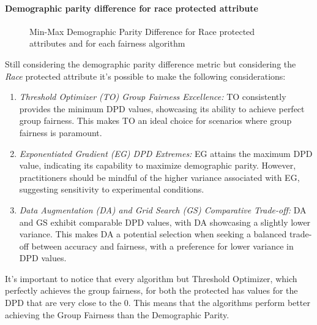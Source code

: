 \paragraph{Demographic parity difference for race protected attribute}

\begin{figure}[H]
    \centering
    \caption{Min-Max Demographic Parity Difference for Race protected attributes and for each fairness algorithm}
\end{figure}

Still considering the demographic parity difference metric but considering the \emph{Race} protected attribute it's possible to make the following considerations:

\begin{enumerate}
    \item \emph{Threshold Optimizer (TO) Group Fairness Excellence:} TO consistently provides the minimum DPD values, showcasing its ability to achieve perfect group fairness. This makes TO an ideal choice for scenarios where group fairness is paramount.

    \item \emph{Exponentiated Gradient (EG) DPD Extremes:} EG attains the maximum DPD value, indicating its capability to maximize demographic parity. However, practitioners should be mindful of the higher variance associated with EG, suggesting sensitivity to experimental conditions.

    \item \emph{Data Augmentation (DA) and Grid Search (GS) Comparative Trade-off:} DA and GS exhibit comparable DPD values, with DA showcasing a slightly lower variance. This makes DA a potential selection when seeking a balanced trade-off between accuracy and fairness, with a preference for lower variance in DPD values.
\end{enumerate}


It's important to notice that every algorithm but Threshold Optimizer, which perfectly achieves the group fairness, for both the protected has values for the DPD that are very close to the 0. This means that the algorithms perform better achieving the Group Fairness than the Demographic Parity.